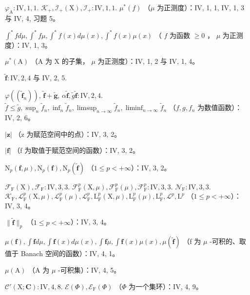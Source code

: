 \(\varphi_{\mathrm{A}}:\mathrm{IV},1,1.\) \(\mathcal{K}_{+},\mathcal{I}_{+}(\mathrm{X}),\mathcal{I}_{+}:\mathrm{IV},1,1.\) \(\mu^{*}(f)\) （\(\mu\) 为正测度）：IV, 1, 1, IV, 1, 3 与 IV, 4, 习题 5。

\(\int^{*}fd\mu,\int^{*}f\mu,\int^{*}f(x)d\mu(x),\int^{*}f(x)\mu(x)\) （ \(f\) 为函数 \(\geqslant 0\) ， \(\mu\) 为正测度）：IV, 1, 3。

\(\mu^{*}(\mathrm{A})\) （A 为 X 的子集， \(\mu\) 为正测度）：IV, 1, 2 与 IV, 1, 4。

\(\widetilde{\mathbf{f}}:\mathrm{IV},2,4\) 与 IV, 2, 5.

\(\varphi((\widetilde{\mathbf{f}}_n))\), \(\widetilde{\mathbf{f}} +\widetilde{\mathbf{g}}\), \(\alpha \widetilde{\mathbf{f}},\widetilde{g}\widetilde{\mathbf{f}}:\mathrm{IV},2,4.\) \(\widetilde{f}\leqslant \widetilde{g},\sup_{n}\widetilde{f}_n,\inf_n\widetilde{f}_n,\limsup_{n\to \infty}\widetilde{f}_n,\liminf_{n\to \infty}\widetilde{f}_n\) （\(f,g,f_n\) 为数值函数）：IV, 2, 6。

\(|\mathbf{z}|\) （z 为赋范空间中的点）：IV, 3, 2。

\(|\mathbf{f}|\) （f 为取值于赋范空间的函数）：IV, 3, 2。

\(\mathrm{N}_p(\mathbf{f},\mu),\mathrm{N}_p(\mathbf{f}),\mathrm{N}_p(\widetilde{\mathbf{f}})\) （\(1\leqslant p<+\infty\)）：IV, 3, 2。

\(\mathcal{F}_{\mathrm{F}}(\mathrm{X}),\mathcal{F}_{\mathrm{F}}:\mathrm{IV},3,3.\) \(\mathcal{F}_{\mathrm{F}}^{p}(\mathrm{X},\mu),\mathcal{F}_{\mathrm{F}}^{p}(\mu),\mathcal{F}_{\mathrm{F}}^{p}:\mathrm{IV},3,3.\) \(\mathcal{N}_{\mathrm{F}}:\mathrm{IV},3,3.\) \(\mathcal{K}_{\mathrm{F}},\mathcal{L}_{\mathrm{F}}^{p}(\mathrm{X},\mu),\mathcal{L}_{\mathrm{F}}^{p}(\mu),\mathcal{L}_{\mathrm{F}}^{p},\mathrm{L}_{\mathrm{F}}^{p}(\mathrm{X},\mu),\mathrm{L}_{\mathrm{F}}^{p}(\mu),\mathrm{L}_{\mathrm{F}}^{p},\mathcal{L}^{p},\mathrm{L}^{p}\) （\(1\leqslant p<+\infty\)）：IV, 3, 4。

\(\| \widetilde{\mathbf{f}} \| _p\) （\(1\leqslant p < + \infty\)）：IV, 3, 4。

\(\mu (\mathbf{f}),\int \mathbf{f}d\mu ,\int \mathbf{f}(x)d\mu (x),\int \mathbf{f}\mu ,\int \mathbf{f}(x)\mu (x),\mu (\widetilde{\mathbf{f}})\) （f 为 \(\mu\) -可积的、取值于 Banach 空间的函数）：IV, 4, 1。

\(\mu (\mathrm{A})\) （A 为 \(\mu\) -可积集）：IV, 4, 5。

\(\mathcal{C}'(\mathrm{X};\mathbf{C}):\mathrm{IV},4,8.\) \(\mathcal{E}(\Phi),\mathcal{E}_{\mathrm{F}}(\Phi)\) （\(\Phi\) 为一个集环）：IV, 4, 9。

